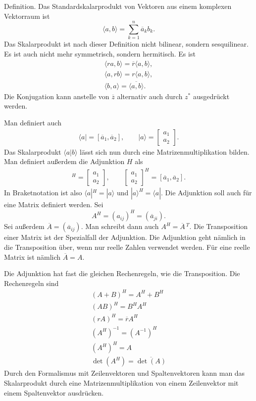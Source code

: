 \documentclass[a4paper,10pt,fleqn,twocolumn,twoside]{article}
\begin{document}
Definition. Das Standardskalarprodukt von Vektoren aus einem komplexen
Vektorraum ist
\[\langle a,b\rangle = \sum_{k=1}^n \overline a_kb_k.\]
Das Skalarprodukt ist nach dieser Definition nicht bilinear, sondern
sesquilinear. Es ist auch nicht mehr symmetrisch, sondern hermitisch.
Es ist
\begin{gather*}
\langle ra,b\rangle = \overline r\langle a,b\rangle,\\
\langle a,rb\rangle = r\langle a,b\rangle,\\
\langle b,a\rangle = \overline{\langle a,b\rangle}.
\end{gather*}
Die Konjugation kann anstelle von \(\overline z\) alternativ auch
durch \(z^\ast\) ausgedrückt werden.

Man definiert auch
\begin{gather*}
\langle a| = [\overline a_1,\overline a_2],\qquad
|a\rangle = \begin{bmatrix}a_1\\ a_2\end{bmatrix}.
\end{gather*}
Das Skalarprodukt \(\langle a|b\rangle\) lässt sich nun durch eine
Matrizenmultiplikation bilden. Man definiert außerdem die
Adjunktion \(H\) als
\begin{gather*}
[\overline a_1,\overline a_2]^H
= \begin{bmatrix}a_1\\ a_2\end{bmatrix},\qquad
\begin{bmatrix}a_1\\ a_2\end{bmatrix}^H
= [\overline a_1,\overline a_2].
\end{gather*}
In Braketnotation ist also \(\langle a|^H=|a\rangle\) und
\(|a\rangle^H=\langle a|\). Die Adjunktion soll auch für eine Matrix
definiert werden. Sei
\[A^H = (a_{ij})^H = (\overline a_{ji}).\]
Sei außerdem \(\overline A=(\overline a_{ij})\). Man schreibt dann
auch \(A^H = \overline A\,{}^T\). Die Transposition einer Matrix ist
der Spezialfall der Adjunktion. Die Adjunktion geht nämlich in die
Transposition über, wenn nur reelle Zahlen verwendet werden. Für eine
reelle Matrix ist nämlich \(\overline A=A\).

Die Adjunktion hat fast die gleichen Rechenregeln, wie die
Transposition. Die Rechenregeln sind
\begin{gather*}
(A+B)^H = A^H+B^H\\
(AB)^H = B^H A^H\\
(rA)^H = \overline r A^H\\
(A^H)^{-1} = (A^{-1})^H\\
(A^H)^H = A\\
\det(A^H) = \overline{\det(A)}
\end{gather*}
Durch den Formalismus mit Zeilenvektoren und Spaltenvektoren kann man
das Skalarprodukt durch eine Matrizenmultiplikation von einem
Zeilenvektor mit einem Spaltenvektor ausdrücken.
\end{document}
